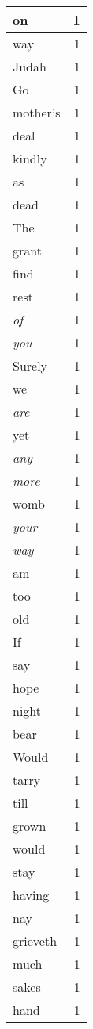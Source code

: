 \begin{center}
\begin{longtable}{l|r}
on & 1 \\ \hline
way & 1 \\ \hline
Judah & 1 \\ \hline
Go & 1 \\ \hline
mother's & 1 \\ \hline
deal & 1 \\ \hline
kindly & 1 \\ \hline
as & 1 \\ \hline
dead & 1 \\ \hline
The & 1 \\ \hline
grant & 1 \\ \hline
find & 1 \\ \hline
rest & 1 \\ \hline
\emph{of} & 1 \\ \hline
\emph{you} & 1 \\ \hline
Surely & 1 \\ \hline
we & 1 \\ \hline
\emph{are} & 1 \\ \hline
yet & 1 \\ \hline
\emph{any} & 1 \\ \hline
\emph{more} & 1 \\ \hline
womb & 1 \\ \hline
\emph{your} & 1 \\ \hline
\emph{way} & 1 \\ \hline
am & 1 \\ \hline
too & 1 \\ \hline
old & 1 \\ \hline
If & 1 \\ \hline
say & 1 \\ \hline
hope & 1 \\ \hline
night & 1 \\ \hline
bear & 1 \\ \hline
Would & 1 \\ \hline
tarry & 1 \\ \hline
till & 1 \\ \hline
grown & 1 \\ \hline
would & 1 \\ \hline
stay & 1 \\ \hline
having & 1 \\ \hline
nay & 1 \\ \hline
grieveth & 1 \\ \hline
much & 1 \\ \hline
sakes & 1 \\ \hline
hand & 1 \\ \hline

\end{longtable}
\end{center}
